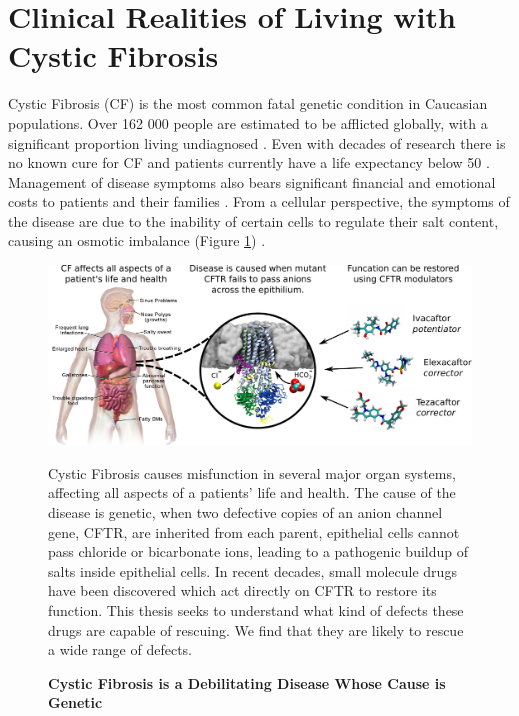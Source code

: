 

\section{Clinical Realities of Living with Cystic Fibrosis}
\label{clinical_realities_CF}
Cystic Fibrosis (CF) is the most common fatal genetic condition in Caucasian populations. Over 162 000 people are estimated to be afflicted globally, with a significant proportion living undiagnosed \cite{hammoudeh2021,guo2022}. Even with decades of research there is no known cure for CF and patients currently have a life expectancy below 50 \cite{mcbennett2022}. Management of disease symptoms also bears significant financial and emotional costs to patients and their families \cite{vangool2013, page2022}. From a cellular perspective, the symptoms of the disease are due to the inability of certain cells to regulate their salt content, causing an osmotic imbalance (Figure \ref{CF_summary}) \cite{reddy2013}. 

\begin{figure}
	\label{CF_summary}
	\begin{center}
	\includegraphics[width=1\textwidth]{figures/cf_summary_fig.pdf}
	\end{center}
	\captionsetup{singlelinecheck = false, justification=raggedright}
	\caption[Cystic Fibrosis is a Debilitating Disease Whose Cause is Genetic] {\textbf{Cystic Fibrosis is a Debilitating Disease Whose Cause is Genetic}}{Cystic Fibrosis causes misfunction in several major organ systems, affecting all aspects of a patients' life and health. The cause of the disease is genetic, when two defective copies of an anion channel gene, CFTR, are inherited from each parent, epithelial cells cannot pass chloride or bicarbonate ions, leading to a pathogenic buildup of salts inside epithelial cells. In recent decades, small molecule drugs have been discovered which act directly on CFTR to restore its function. This thesis seeks to understand what kind of defects these drugs are capable of rescuing. We find that they are likely to rescue a wide range of defects.} 
\end{figure}


